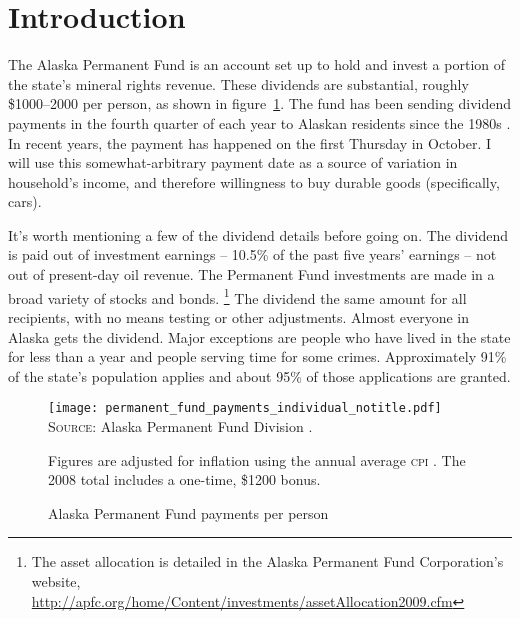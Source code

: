 \documentclass[11pt,letterpaper,oneside]{article}
\begin{document}
\pagebreak
\section{Introduction}


The Alaska Permanent Fund is an account set up to hold and invest a portion of the state's mineral rights revenue.
These dividends are substantial, roughly \$1000--2000 per person, as shown in figure~\ref{fig:permanent-fund-payments-individual}.
The fund has been sending dividend payments in the fourth quarter of each year to Alaskan residents since the 1980s \parencite{hsieh2003}.
In recent years, the payment has happened on the first Thursday in October.
I will use this somewhat-arbitrary payment date as a source of variation in household's income, and therefore willingness to buy durable goods (specifically, cars).




It's worth mentioning a few of the dividend details before going on.
The dividend is paid out of investment earnings -- 10.5\% of the past five years' earnings -- not out of present-day oil revenue.
The Permanent Fund investments are made in a broad variety of stocks and bonds.%
\footnote{The asset allocation is detailed in the Alaska Permanent Fund Corporation's website, \url{http://apfc.org/home/Content/investments/assetAllocation2009.cfm}}
The dividend the same amount for all recipients, with no means testing or other adjustments.
Almost everyone in Alaska gets the dividend.
Major exceptions are people who have lived in the state for less than a year and people serving time for some crimes.
Approximately 91\% of the state's population applies and about 95\% of those applications are granted.

\begin{figure}[bht]
    \caption{\large Alaska Permanent Fund payments per person}
    \texttt{[image: permanent\_fund\_payments\_individual\_notitle.pdf]}
    \label{fig:permanent-fund-payments-individual}
    \textsc{Source:} Alaska Permanent Fund Division \parencite{apfd_payments_summary}.\par
		Figures are adjusted for inflation using the annual average \textsc{cpi} \parencite{fred_inflation}.
		The 2008 total includes a one-time, \$1200 bonus.
\end{figure}
\end{document}
